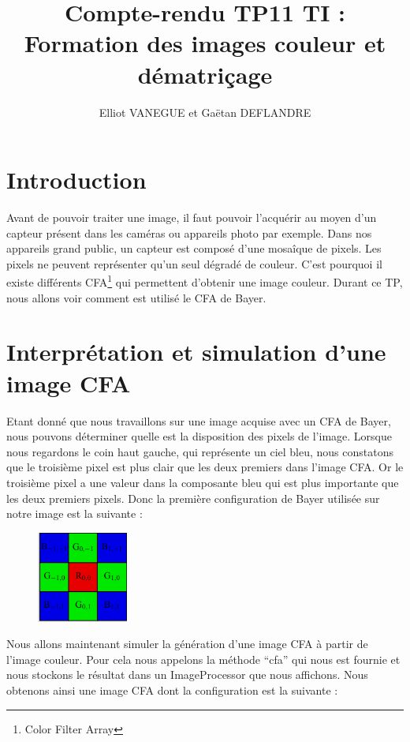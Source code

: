 \documentclass[a4paper,11pt]{article}
\title{Compte-rendu TP11 TI : Formation des images couleur et dématriçage}
\author{Elliot VANEGUE et Gaëtan DEFLANDRE}
\begin{document}


  \maketitle
  
  \mbox{}
  \newpage
  \clearpage
  
  \section{Introduction}
  Avant de pouvoir traiter une image, il faut pouvoir l'acquérir au moyen d'un capteur présent dans les
  caméras ou appareils photo par exemple. Dans nos appareils grand public, un capteur est composé d'une mosaîque
  de pixels. Les pixels ne peuvent représenter qu'un seul dégradé de couleur. C'est pourquoi il existe différents
  CFA\footnote{Color Filter Array} qui permettent d'obtenir une image couleur. Durant ce TP, nous allons voir
  comment est utilisé le CFA de Bayer.
  
  \section{Interprétation et simulation d'une image CFA}
  Etant donné que nous travaillons sur une image acquise avec un CFA de Bayer, nous pouvons déterminer quelle est
  la disposition des pixels de l'image. Lorsque nous regardons le coin haut gauche, qui représente un ciel bleu, nous
  constatons que le troisième pixel est plus clair que les deux premiers dans l'image CFA. Or le troisième pixel 
  a une valeur dans la composante bleu qui est plus importante que les deux premiers pixels. Donc la première configuration
  de Bayer utilisée sur notre image est la suivante : \\
  
  \begin{figure}[H]
  \center
   \includegraphics[width=3cm]{bayerGRG.png}
  \end{figure}

  Nous allons maintenant simuler la génération d'une image CFA à partir de l'image couleur. Pour
  cela nous appelons la méthode \enquote{cfa} qui nous est fournie et nous stockons le résultat
  dans un ImageProcessor que nous affichons. Nous obtenons ainsi une image CFA dont la configuration
  est la suivante :
  
\end{document}
